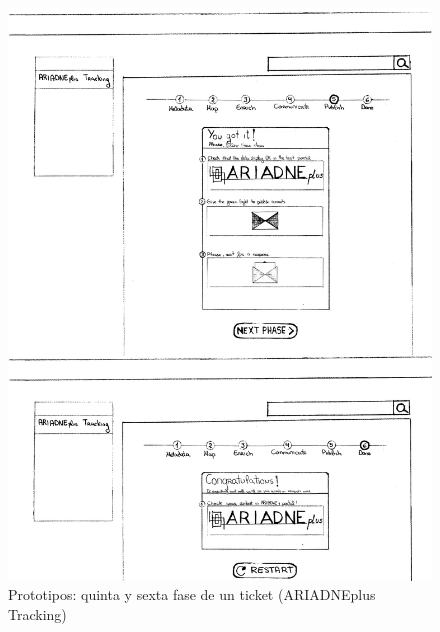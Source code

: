 \documentclass[
]{article}
\begin{document}
\begin{figure}
\hypertarget{phase-5-6-prototipe}{%
\centering
\includegraphics{../_static/images/phase-5-6-prototipe.png}
\caption{Prototipos: quinta y sexta fase de un ticket (ARIADNEplus
Tracking)}\label{phase-5-6-prototipe}
}
\end{figure}
\end{document}
